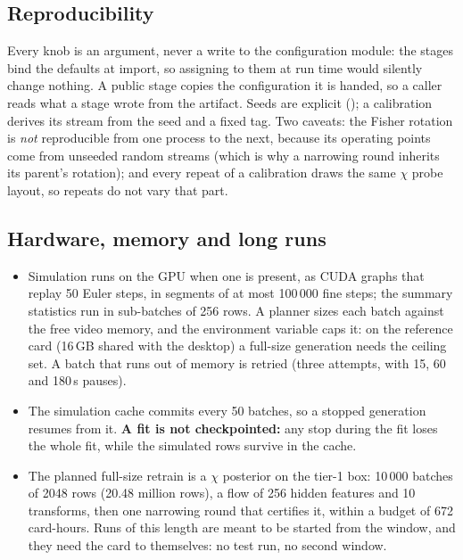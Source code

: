 \documentclass[10pt,a4paper]{article}
\newcommand{\code}[1]{\texttt{\detokenize{#1}}}
\begin{document}
\subsection{Reproducibility}

Every knob is an argument, never a write to the configuration module: the stages bind the defaults at import, so assigning
to them at run time would silently change nothing. A public stage copies the configuration it is handed, so a caller reads
what a stage wrote from the artifact. Seeds are explicit (\code{--seed}); a calibration derives its stream from the seed and a
fixed tag. Two caveats: the Fisher rotation is \emph{not} reproducible from one process to the next, because its operating points
come from unseeded random streams (which is why a narrowing round inherits its parent's rotation); and every repeat of a
calibration draws the same $\chi$ probe layout, so repeats do not vary that part.

\subsection{Hardware, memory and long runs}

\begin{itemize}[leftmargin=1.4em,itemsep=1pt,topsep=2pt]
  \item Simulation runs on the GPU when one is present, as CUDA graphs that replay 50 Euler steps, in segments of at most
        100\,000 fine steps; the summary statistics run in sub-batches of 256 rows. A planner sizes each batch against the free
        video memory, and the environment variable \code{PRISM_VRAM_CEILING_GIB} caps it: on the reference card (16\,GB shared
        with the desktop) a full-size generation needs the ceiling set. A batch that runs out of memory is retried (three
        attempts, with 15, 60 and 180\,s pauses).
  \item The simulation cache commits every 50 batches, so a stopped generation resumes from it. \textbf{A fit is not
        checkpointed:} any stop during the fit loses the whole fit, while the simulated rows survive in the cache.
  \item The planned full-size retrain is a $\chi$ posterior on the tier-1 box: 10\,000 batches of 2048 rows (20.48 million
        rows), a flow of 256 hidden features and 10 transforms, then one narrowing round that certifies it, within a budget of
        672 card-hours. Runs of this length are meant to be started from the window, and they need the card to themselves:
        no test run, no second window.
\end{itemize}
\end{document}
